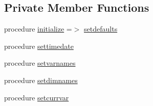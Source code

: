 \subsection*{Private Member Functions}
\begin{DoxyCompactItemize}
\item 
procedure \mbox{\hyperlink{structsimulationglobals__mod_1_1globals__class_a3b8fe335ee4571c73b774cbbe37820cf}{initialize}} =$>$ \mbox{\hyperlink{namespacesimulationglobals__mod_aa01e0a958ef2e94a02991dcfe390bfa0}{setdefaults}}
\item 
procedure \mbox{\hyperlink{structsimulationglobals__mod_1_1globals__class_a9afa580356002f4a94376ad3f925cb35}{settimedate}}
\item 
procedure \mbox{\hyperlink{structsimulationglobals__mod_1_1globals__class_ac9fcf75928fccae1c6ac5c98603ed9b8}{setvarnames}}
\item 
procedure \mbox{\hyperlink{structsimulationglobals__mod_1_1globals__class_a4eb2eb6a506cf6cd16ac710cf7d5689c}{setdimnames}}
\item 
procedure \mbox{\hyperlink{structsimulationglobals__mod_1_1globals__class_ae1d8dcce038856889fec915c28a054ce}{setcurrvar}}
\end{DoxyCompactItemize}
